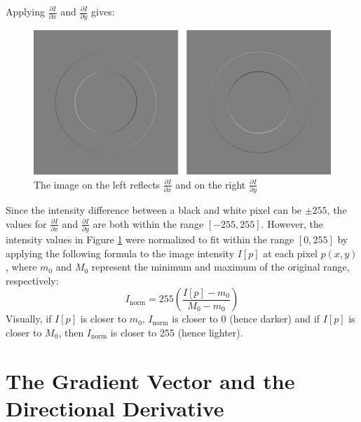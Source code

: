 \documentclass{article}
\begin{document}
Applying $\frac{\partial I}{\partial x}$ and $\frac{\partial I}{\partial y}$ gives:

\begin{figure}[!hbtp]
    \centering
    \includegraphics[width=\linewidth]{figures/figure07.png}
    \caption[{The image on the left reflects $\frac{\partial I}{\partial x}$ and on the right $\frac{\partial I}{\partial y}$}]{The image on the left reflects $\frac{\partial I}{\partial x}$ and on the right $\frac{\partial I}{\partial y}$}
    \label{fig:figure 7}
\end{figure}

Since the intensity difference between a black and white pixel can be $\pm255$, the values for $\frac{\partial I}{\partial x}$ and $\frac{\partial I}{\partial y}$ are both within the range $[-255,255]$. However, the intensity values in Figure \ref{fig:figure 7} were normalized to fit within the range $[0,255]$ by applying the following formula to the image intensity $I[p]$ at each pixel $p(x,y)$, where $m_0$ and $M_0$ represent the minimum and maximum of the original range, respectively:
\begin{equation}
    I_\text{norm} = 255 \left( \frac{I[p] - m_0}{M_0 - m_0} \right) \nonumber
\end{equation}
Visually, if $I[p]$ is closer to $m_0$, $I_\text{norm}$ is closer to 0 (hence darker) and if $I[p]$ is closer to $M_0$, then $I_\text{norm}$ is closer to 255 (hence lighter).

\section{The Gradient Vector and the Directional Derivative}
\end{document}
